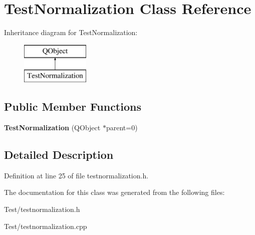 \hypertarget{class_test_normalization}{}\section{Test\+Normalization Class Reference}
\label{class_test_normalization}
Inheritance diagram for Test\+Normalization\+:\begin{figure}[H]
\begin{center}
\leavevmode
\includegraphics[height=2.000000cm]{class_test_normalization}
\end{center}
\end{figure}
\subsection*{Public Member Functions}
\begin{DoxyCompactItemize}
\item 
{\bfseries Test\+Normalization} (Q\+Object $\ast$parent=0)\hypertarget{class_test_normalization_ae3e38c1b2ab4c04941d3b043237c1bad}{}\label{class_test_normalization_ae3e38c1b2ab4c04941d3b043237c1bad}

\end{DoxyCompactItemize}


\subsection{Detailed Description}


Definition at line 25 of file testnormalization.\+h.



The documentation for this class was generated from the following files\+:\begin{DoxyCompactItemize}
\item 
Test/testnormalization.\+h\item 
Test/testnormalization.\+cpp\end{DoxyCompactItemize}
